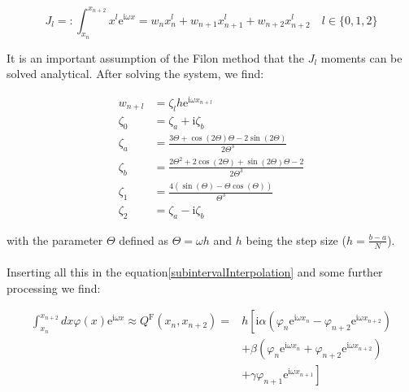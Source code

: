 \begin{equation}
    J_{l}=:\int_{x_{n}}^{x_{n+2}} x^{l} \mathrm{e}^{\mathrm{i} \omega x}=w_{n} x_{n}^{l}+w_{n+1} x_{n+1}^{l}+w_{n+2} x_{n+2}^{l} \quad l \in\{0,1,2\}
\end{equation}

It is an important assumption of the Filon method that the $J_l$ moments can be solved analytical.  
After solving the system, we find: 

\begin{equation}
    \begin{aligned}
        w_{n+l} &=\zeta_{l} h \mathrm{e}^{\mathrm{i} \omega x_{n+l}} \\
        \zeta_{0} &=\zeta_{a}+\mathrm{i} \zeta_{b} \\
        \zeta_{a} &=\frac{3 \Theta+\cos (2 \Theta) \Theta-2 \sin (2 \Theta)}{2 \Theta^{3}} \\
        \zeta_{b} &=\frac{2 \Theta^{2}+2 \cos (2 \Theta)+\sin (2 \Theta) \Theta-2}{2 \Theta^{3}} \\
        \zeta_{1} &=\frac{4(\sin (\Theta)-\Theta \cos (\Theta))}{\Theta^{3}} \\
        \zeta_{2} &=\zeta_{a}-\mathrm{i} \zeta_{b}
    \end{aligned} \label{moments}
\end{equation}

with the parameter $\Theta$ defined as $\Theta=\omega h$ and $h$ being the step size ($h=\frac{b-a}{N}$).


\paragraph{}Inserting all this in the equation\eqref{subintervalInterpolation} and some further processing we find:

\begin{equation}
    \begin{aligned}
        \int_{x_{n}}^{x_{n+2}} d x \varphi(x) \mathrm{e}^{\mathrm{i} \omega x} \approx Q^{\text{F}}(x_n,x_{n+2})=
        & h\left[\mathrm{i} \alpha\left(\varphi_{n} \mathrm{e}^{\mathrm{i} \omega x_{n}}-\varphi_{n+2} \mathrm{e}^{\mathrm{i} \omega x_{n+2}}\right)\right.\\
        &+\beta \left(\varphi_{n} \mathrm{e}^{\mathrm{i} \omega x_{n}}+\varphi_{n+2} \mathrm{e}^{\mathrm{i} \omega x_{n+2}}\right) \\
        &\left.+\gamma \varphi_{n+1} \mathrm{e}^{\mathrm{i} \omega x_{n+1}}\right]
    \end{aligned}
\end{equation}


